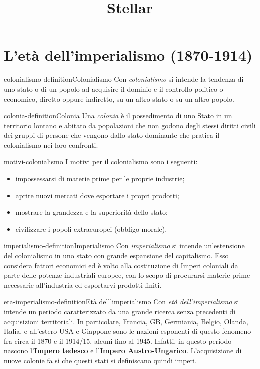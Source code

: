 \documentclass[preview]{standalone}
\begin{document}
\title{Stellar}
\genpage

\section{L'età dell'imperialismo (1870-1914)} %

\begin{snippetdefinition}{colonialismo-definition}{Colonialismo}
    Con \textit{colonialismo} si intende la tendenza di uno stato o di un popolo ad acquisire
    il dominio e il controllo politico
    o economico, diretto oppure indiretto, su un altro stato o su un altro popolo.
\end{snippetdefinition}

\begin{snippetdefinition}{colonia-definition}{Colonia}
    Una \textit{colonia} è il possedimento di uno Stato in un territorio
    lontano e abitato da popolazioni che non godono
    degli stessi diritti civili dei gruppi di persone che vengono dallo stato dominante
    che pratica il colonialismo nei loro confronti.
\end{snippetdefinition}

\begin{snippet}{motivi-colonialismo}
    I motivi per il colonialismo sono i seguenti:
    \begin{itemize}
        \item impossessarsi di materie prime per le proprie industrie;
        \item aprire nuovi mercati dove esportare i propri prodotti;
        \item mostrare la grandezza e la superiorità dello stato;
        \item civilizzare i popoli extraeuropei (obbligo morale).
    \end{itemize}
\end{snippet}

\begin{snippetdefinition}{imperialismo-definition}{Imperialismo}
    Con \textit{imperialismo} si intende un'estensione del colonialismo
    in uno stato con grande espansione del capitalismo.
    Esso considera fattori economici ed è volto alla costituzione di Imperi coloniali da parte
    delle potenze industriali europee, con lo scopo di procurarsi materie prime necessarie all'industria ed esportarvi prodotti finiti.
\end{snippetdefinition}

\begin{snippetdefinition}{eta-imperialismo-definition}{Età dell'imperialismo}
    Con \textit{età dell'imperialismo} si intende un periodo
    caratterizzato da una grande ricerca senza precedenti di acquisizioni territoriali.
    In particolare, Francia, GB, Germiania, Belgio, Olanda, Italia, e all'estero
    USA e Giappone sono le nazioni esponenti di questo fenomeno
    fra circa il 1870 e il 1914/15, alcuni fino al 1945.
    Infatti, in questo periodo nascono l'\textbf{Impero tedesco} e l'\textbf{Impero Austro-Ungarico}.
    L'acquisizione di nuove colonie fa sì che questi stati si definiscano quindi imperi.
\end{snippetdefinition}
\end{document}
